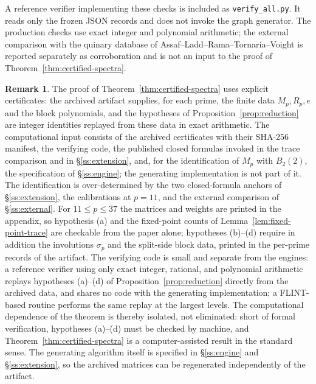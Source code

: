 \documentclass[11pt]{amsart}
\theoremstyle{plain}
\theoremstyle{definition}
\newtheorem{remark}[theorem]{Remark}
\begin{document}
	A reference verifier implementing these checks is included as
	\texttt{verify\_all.py}. It reads only the frozen JSON
	records and does not invoke the graph generator. The production checks use
	exact integer and polynomial arithmetic; the external comparison with the
	quinary database of Assaf--Ladd--Rama--Tornar\'ia--Voight is reported
	separately as corroboration and is not an input to the proof of
	Theorem~\ref{thm:certified-spectra}.
	
	\begin{remark}\label{rem:trustedbase}
		The proof of Theorem~\ref{thm:certified-spectra} uses explicit certificates: the archived artifact supplies,
		for each prime, the finite data $M_p,R_p,e$ and the block polynomials, and the hypotheses of Proposition~\ref{prop:reduction} are integer identities replayed from these data in exact
		arithmetic. The computational input consists of the archived certificates with their
		SHA-256 manifest, the verifying code, the published closed formulas invoked in the
		trace comparison and in \S\ref{ss:extension}, and, for the identification of $M_p$ with $B_2(2)$,
		the specification of \S\ref{ss:engine}; the generating implementation is not part of it.
		The identification is over-determined by the two closed-formula anchors of \S\ref{ss:extension},
		the calibrations 	at $p=11$, and the external comparison of \S\ref{ss:external}.
		For 	$11\le p\le37$ the matrices and weights are printed in the appendix,
		so hypothesis \textup{(a)} and the fixed-point counts of Lemma~\ref{lem:fixed-point-trace} are
		checkable from the paper alone; 	hypotheses \textup{(b)}--\textup{(d)} require in addition the
		involutions $\sigma_p$ and the split-side block data, printed in the
		per-prime records of the artifact. The verifying code is small
		and separate from the engines: a reference verifier using only exact
		integer, rational, and polynomial arithmetic replays hypotheses
		\textup{(a)}--\textup{(d)} of Proposition~\ref{prop:reduction} directly
		from the archived data, and shares no code with the generating
		implementation; a FLINT-based routine performs the same replay at the
		largest levels. The computational dependence of the theorem is thereby
		isolated, not eliminated: short of formal verification, hypotheses
		\textup{(a)}--\textup{(d)} must be checked by machine, and
		Theorem~\ref{thm:certified-spectra} is a computer-assisted result in the
		standard sense. The generating algorithm itself is specified in
		\S\ref{ss:engine} and \S\ref{ss:extension}, so the archived matrices can
		be regenerated independently of the artifact.
	\end{remark}
	
\end{document}
